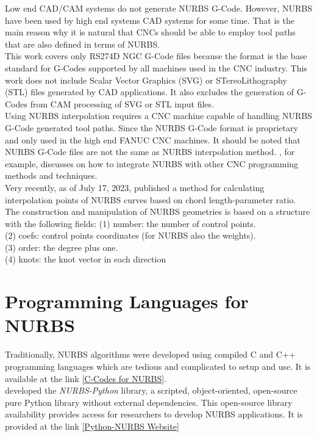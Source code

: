 Low end CAD/CAM systems do not generate NURBS G-Code. However, NURBS have been used by high end systems CAD systems for some time. That is the main reason why it is natural that CNCs should be able to employ tool paths that are also defined in terms of NURBS.\\

This work covers only RS274D NGC G-Code files because the format is the base standard for G-Codes supported by all machines used in the CNC industry. This work does not include Scalar Vector Graphics (SVG) or STereoLithography (STL) files generated by CAD applications. It also excludes the generation of G-Codes from CAM processing of SVG or STL input files.\\

Using NURBS interpolation requires a CNC machine capable of handling NURBS G-Code generated tool paths. Since the NURBS G-Code format is proprietary and only used in the high end FANUC CNC machines. It should be noted that NURBS G-Code files are not the same as NURBS interpolation method. \cite{CollabCNC:2023A}, for example, discusses on how to integrate NURBS with other CNC programming methods and techniques.\\ 

Very recently, as of July 17, 2023, \cite {Hu-etal:2023} published a method for calculating interpolation points of NURBS curves based on chord length-parameter ratio. \\

The construction and manipulation of NURBS geometries is based on a structure with the following fields:
\singlespacing
\noindent
(1) number: the number of control points.\\
(2) coefs: control points coordinates (for NURBS also the weights).\\
(3) order: the degree plus one.\\
(4) knots: the knot vector in each direction

\section{Programming Languages for NURBS}

Traditionally, NURBS algorithms were developed using compiled C and C++ programming languages which are tedious and complicated to setup and use. It is available at the link [\href{https://www.nar-associates.com/nurbs/c_code.html}{C-Codes for NURBS}]. \\

\cite{Bingol-etal:2018} developed the \textit{NURBS-Python} library, a scripted, object-oriented, open-source pure Python library without external dependencies. This open-source library availability provides access for researchers to develop NURBS applications. It is provided at the link [\href{https://nurbs-python.readthedocs.io/en/5.x/}{Python-NURBS Website}] \\

